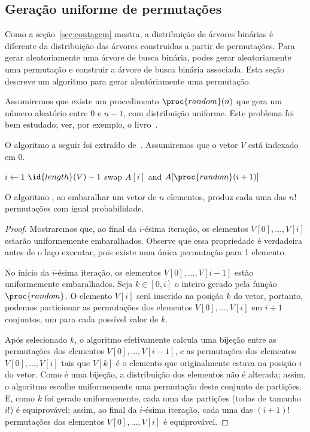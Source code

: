 \subsection{Geração uniforme de permutações}

Como a seção~\ref{sec:contagem} mostra,
a distribuição de árvores binárias é diferente
da distribuição das árvores construidas a partir de permutações.
Para gerar aleatoriamente uma árvore de busca binária,
podes gerar aleatoriamente uma permutação
e construir a árvore de busca binária associada.
Esta seção descreve um algoritmo para gerar aleatóriamente uma permutação.

Assumiremos que existe um procedimento $\proc{random}(n)$
que gera um número aleatório entre $0$ e $n-1$, com distribuição uniforme.
Este problema foi bem estudado; ver, por exemplo, o livro~\cite{Knuth1997}.

O algoritmo a seguir foi extraído de~\cite[p.~357]{SedgewickFlajolet2013}.
Assumiremos que o vetor $V$ está indexado em $0$.

\begin{codebox}
    \li \For $i \gets 1$ \To $\id{length}(V) - 1$
    \li \Do
            swap $A[i]$ and $A[\proc{random}(i+1)]$
    \End
\end{codebox}

\begin{proposition}
    O algoritmo ,
    ao embaralhar um vetor de $n$ elementos,
    produz cada uma das $n!$ permutações
    com igual probabilidade.
\end{proposition}

\begin{proof}
    Mostraremos que, ao final da $i$-ésima iteração,
    os elementos $V[0], \dots, V[i]$
    estarão uniformemente embaralhados.
    Observe que essa propriedade é verdadeira antes de o laço executar,
    pois existe uma única permutação para 1 elemento.

    No início da $i$-ésima iteração,
    os elementos $V[0], \dots, V[i-1]$
    estão uniformemente embaralhados.
    Seja $k \in [0, i]$ o inteiro gerado pela função $\proc{random}$.
    O elemento $V[i]$ será inserido na posição $k$ do vetor,
    portanto,
    podemos particionar as permutações dos elementos $V[0], \dots, V[i]$
    em $i+1$ conjuntos,
    um para cada possível valor de $k$.

    Após selecionado $k$,
    o algoritmo efetivamente calcula uma bijeção entre
    as permutações dos elementos $V[0], \dots, V[i-1]$,
    e as permutações dos elementos $V[0], \dots, V[i]$ tais que 
    $V[k]$ é o elemento que originalmente estava na posição $i$ do vetor.
    Como é uma bijeção,
    a distribuição dos elementos não é alterada;
    assim, o algoritmo escolhe uniformemente uma permutação
    deste conjunto de partições.
    E, como $k$ foi gerado uniformemente,
    cada uma das partições (todas de tamanho $i!$) é equiprovável;
    assim, ao final da $i$-ésima iteração,
    cada uma das $(i+1)!$ permutações dos elementos $V[0], \dots, V[i]$
    é equiprovável.
\end{proof}
